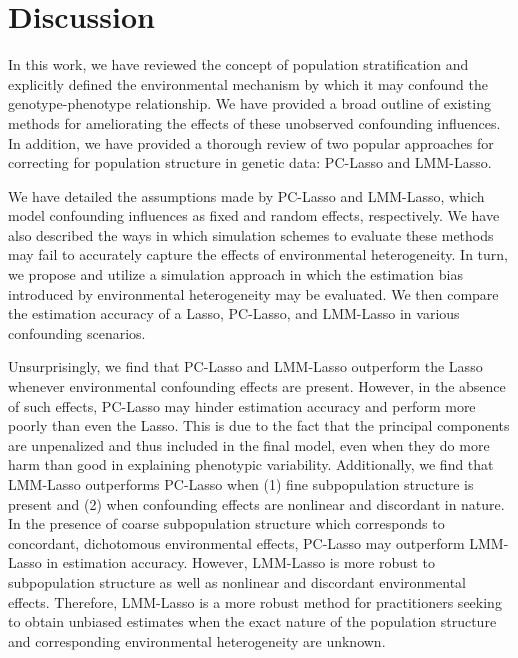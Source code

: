 \section{Discussion} \label{sec:discussion}
In this work, we have reviewed the concept of population stratification and explicitly defined the environmental mechanism by which it may confound the genotype-phenotype relationship. We have provided a broad outline of existing methods for ameliorating the effects of these unobserved confounding influences. In addition, we have provided a thorough review of two popular approaches for correcting for population structure in genetic data: PC-Lasso and LMM-Lasso. 

We have detailed the assumptions made by PC-Lasso and LMM-Lasso, which model confounding influences as fixed and random effects, respectively. We have also described the ways in which simulation schemes to evaluate these methods may fail to accurately capture the effects of environmental heterogeneity. In turn, we propose and utilize a simulation approach in which the estimation bias introduced by environmental heterogeneity may be evaluated. We then compare the estimation accuracy of a  Lasso, PC-Lasso, and LMM-Lasso in various confounding scenarios.

Unsurprisingly, we find that PC-Lasso and LMM-Lasso outperform the  Lasso whenever environmental confounding effects are present. However, in the absence of such effects, PC-Lasso may hinder estimation accuracy and perform more poorly than even the  Lasso. This is due to the fact that the principal components are unpenalized and thus included in the final model, even when they do more harm than good in explaining phenotypic variability. Additionally, we find that LMM-Lasso outperforms PC-Lasso when (1) fine subpopulation structure is present and (2) when confounding effects are nonlinear and discordant in nature. In the presence of coarse subpopulation structure which corresponds to concordant, dichotomous environmental effects, PC-Lasso may outperform LMM-Lasso in estimation accuracy. However, LMM-Lasso is more robust to subpopulation structure as well as nonlinear and discordant environmental effects. Therefore, LMM-Lasso is a more robust method for practitioners seeking to obtain unbiased estimates when the exact nature of the population structure and corresponding environmental heterogeneity are unknown.  

